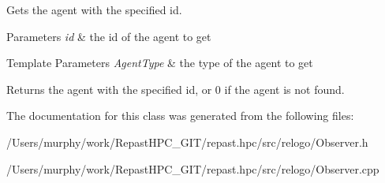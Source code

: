 Gets the agent with the specified id. 


\begin{DoxyParams}{Parameters}
{\em id} & the id of the agent to get \\
\hline
\end{DoxyParams}

\begin{DoxyTemplParams}{Template Parameters}
{\em Agent\-Type} & the type of the agent to get\\
\hline
\end{DoxyTemplParams}
\begin{DoxyReturn}{Returns}
the agent with the specified id, or 0 if the agent is not found. 
\end{DoxyReturn}


The documentation for this class was generated from the following files\-:\begin{DoxyCompactItemize}
\item 
/\-Users/murphy/work/\-Repast\-H\-P\-C\-\_\-\-G\-I\-T/repast.\-hpc/src/relogo/Observer.\-h\item 
/\-Users/murphy/work/\-Repast\-H\-P\-C\-\_\-\-G\-I\-T/repast.\-hpc/src/relogo/Observer.\-cpp\end{DoxyCompactItemize}
